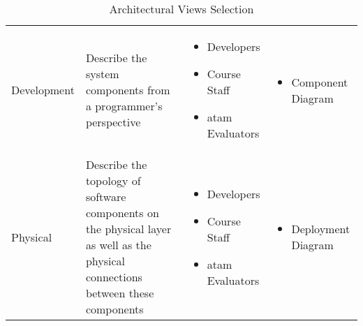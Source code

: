 \begin{table}[ht]
\begin{tabularx}{\textwidth}{p{2cm}Xp{4cm}p{4cm}}
				Development & Describe the system components from a programmer's perspective &
				\begin{minipage}[t]{\textwidth}
					\begin{itemize}[noitemsep, leftmargin=15pt]
						\item Developers
						\item Course Staff
						\item \gls{atam} Evaluators
					\end{itemize}
				\end{minipage}
				&
				\begin{minipage}[t]{\textwidth}
					\begin{itemize}[noitemsep, leftmargin=10pt]
						\item Component Diagram
					\end{itemize}
				\end{minipage} \\

				Physical & Describe the topology of software components on the physical layer as well as the physical connections between these components &
				\begin{minipage}[t]{\textwidth}
					\begin{itemize}[noitemsep, leftmargin=15pt]
						\item Developers
						\item Course Staff
						\item \gls{atam} Evaluators
					\end{itemize}
				\end{minipage}
				&
				\begin{minipage}[t]{\textwidth}
					\begin{itemize}[noitemsep, leftmargin=10pt]
						\item Deployment Diagram
					\end{itemize}
				\end{minipage} \\
			\bottomrule
		\end{tabularx}
		\caption{Architectural Views Selection}
		\label{tab:viewSelection}
	\end{table}
\egroup
